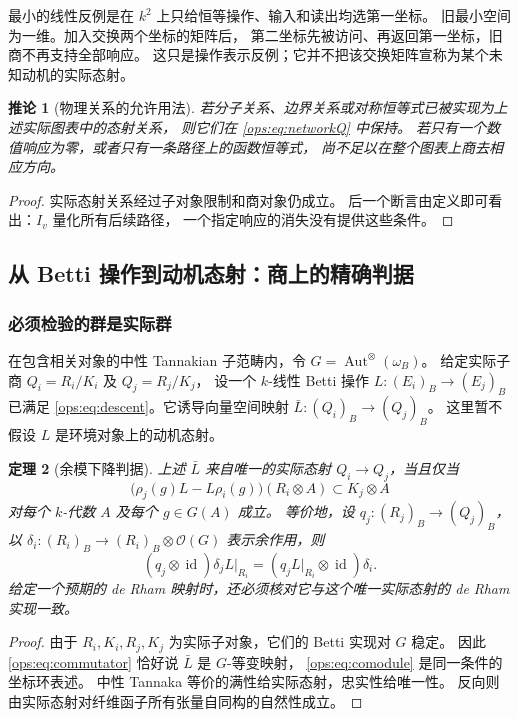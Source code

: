 \documentclass[11pt,a4paper,oneside]{ctexart}
\theoremstyle{cnplain}
\newtheorem{theorem}{定理}[section]
\newtheorem{corollary}[theorem]{推论}
\theoremstyle{definition}
\theoremstyle{remark}
\newcommand{\id}{\operatorname{id}}
\numberwithin{equation}{section}
\begin{document}
最小的线性反例是在 $k^2$ 上只给恒等操作、输入和读出均选第一坐标。
旧最小空间为一维。加入交换两个坐标的矩阵后，
第二坐标先被访问、再返回第一坐标，旧商不再支持全部响应。
这只是操作表示反例；它并不把该交换矩阵宣称为某个未知动机的实际态射。

\begin{corollary}[物理关系的允许用法]
若分子关系、边界关系或对称恒等式已被实现为上述实际图表中的态射关系，
则它们在 \eqref{ops:eq:networkQ} 中保持。
若只有一个数值响应为零，或者只有一条路径上的函数恒等式，
尚不足以在整个图表上商去相应方向。
\end{corollary}
\begin{proof}
实际态射关系经过子对象限制和商对象仍成立。
后一个断言由定义即可看出：$I_v$ 量化所有后续路径，
一个指定响应的消失没有提供这些条件。
\end{proof}


\subsection{从 Betti 操作到动机态射：商上的精确判据}
\subsubsection{必须检验的群是实际群}
在包含相关对象的中性 Tannakian 子范畴内，令
$G=\operatorname{Aut}^{\otimes}(\omega_B)$。
给定实际子商 $Q_i=R_i/K_i$ 及 $Q_j=R_j/K_j$，
设一个 $k$-线性 Betti 操作 $L:(E_i)_B\to(E_j)_B$ 已满足
\eqref{ops:eq:descent}。它诱导向量空间映射 $\bar L:(Q_i)_B\to(Q_j)_B$。
这里暂不假设 $L$ 是环境对象上的动机态射。

\begin{theorem}[余模下降判据]\label{ops:thm:intertwine}
上述 $\bar L$ 来自唯一的实际态射 $Q_i\to Q_j$，当且仅当
\begin{equation}\label{ops:eq:commutator}
 \bigl(\rho_j(g)L-L\rho_i(g)\bigr)(R_i\otimes A)
       \subset K_j\otimes A
\end{equation}
对每个 $k$-代数 $A$ 及每个 $g\in G(A)$ 成立。
等价地，设 $q_j:(R_j)_B\to(Q_j)_B$，以
$\delta_i:(R_i)_B\to(R_i)_B\otimes\mathcal O(G)$ 表示余作用，则
\begin{equation}\label{ops:eq:comodule}
 (q_j\otimes\id)\delta_j L|_{R_i}
       =(q_jL|_{R_i}\otimes\id)\delta_i.
\end{equation}
给定一个预期的 de Rham 映射时，还必须核对它与这个唯一实际态射的
de Rham 实现一致。
\end{theorem}
\begin{proof}
由于 $R_i,K_i,R_j,K_j$ 为实际子对象，它们的 Betti 实现对 $G$ 稳定。
因此 \eqref{ops:eq:commutator} 恰好说 $\bar L$ 是 $G$-等变映射，
\eqref{ops:eq:comodule} 是同一条件的坐标环表述。
中性 Tannaka 等价的满性给实际态射，忠实性给唯一性。
反向则由实际态射对纤维函子所有张量自同构的自然性成立。
\end{proof}
\end{document}
